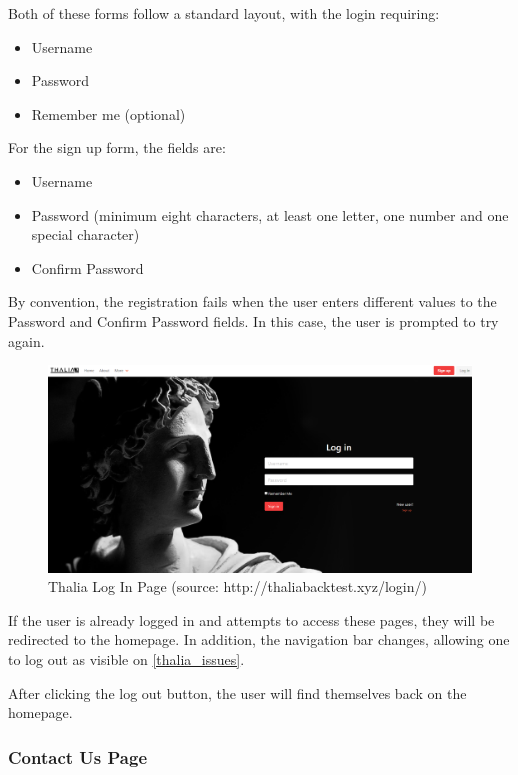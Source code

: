 \documentclass[main.tex]{subfiles}
\begin{document}
Both of these forms follow a standard layout, with the login requiring:

\begin{itemize}
    \item Username
    \item Password
    \item Remember me (optional)
\end{itemize}

For the sign up form, the fields are:

\begin{itemize}
    \item Username
    \item Password (minimum eight characters, at least one letter, one number and one special character)
    \item Confirm Password
\end{itemize}

By convention, the registration fails when the user enters different values to the Password and Confirm Password fields. In this case, the user is prompted to try again.

\begin{figure}[H]
   \centering
   \includegraphics[width=\textwidth]{08Appendices/081User/081Pictures/login.png}
   \caption{Thalia Log In Page (source: http://thaliabacktest.xyz/login/)}
   \label{thalia_login}
\end{figure}

If the user is already logged in and attempts to access these pages, they will be redirected to the homepage. In addition, the navigation bar changes, allowing one to log out as visible on \figurename{\ref{thalia_issues}}.

After clicking the log out button, the user will find themselves back on the homepage.

\subsubsection{Contact Us Page}
\end{document}
